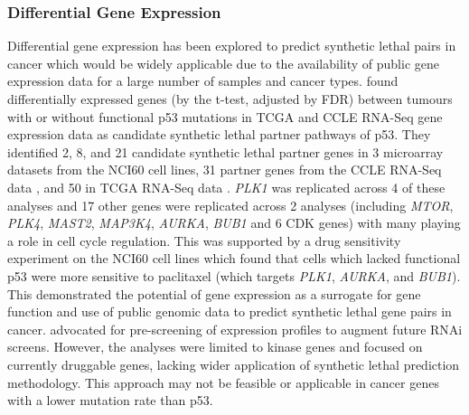\subsubsection{Differential Gene Expression}

Differential gene expression has been explored to predict \gls{synthetic lethal} pairs in cancer which would be widely applicable due to the availability of public gene expression data for a large number of samples and cancer types. \citet{Wang2013} found differentially expressed genes (by the t-test, adjusted by FDR) between tumours with or without functional p53 mutations in \gls{TCGA} \citep{TCGA2008GBM} and \gls{CCLE} \citep{Barretina2012} \gls{RNA-Seq} gene expression data as candidate \gls{synthetic lethal} partner pathways of p53. They identified 2, 8, and 21 candidate \gls{synthetic lethal} partner genes in 3 microarray datasets from the NCI60 cell lines, 31 partner genes from the \gls{CCLE} \gls{RNA-Seq} data \citep{Barretina2012}, and 50 in \gls{TCGA} \gls{RNA-Seq} data \citep{TCGA2012CRC}. \textit{PLK1} was replicated across 4 of these analyses and 17 other genes were replicated across 2 analyses (including \textit{MTOR}, \textit{PLK4}, \textit{MAST2}, \textit{MAP3K4}, \textit{AURKA}, \textit{BUB1} and 6 CDK genes) with many playing a role in cell cycle regulation. This was supported by a drug sensitivity experiment on the NCI60 cell lines which found that cells which lacked functional p53 were more sensitive to paclitaxel (which targets \textit{PLK1}, \textit{AURKA}, and \textit{BUB1}). This demonstrated the potential of gene expression as a surrogate for gene function and use of public genomic data to predict \gls{synthetic lethal} gene pairs in cancer. \citet{Wang2013} advocated for pre-screening of expression profiles to augment future \gls{RNAi} screens. However, the analyses were limited to kinase genes and focused on currently druggable genes, lacking wider application of \gls{synthetic lethal} prediction methodology. This approach may not be feasible or applicable in cancer genes with a lower mutation rate than p53.  

